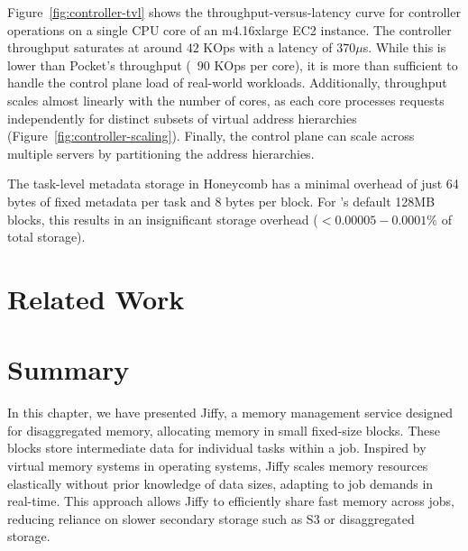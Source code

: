 Figure~\ref{fig:controller-tvl} shows the throughput-versus-latency curve for \jiffy controller operations on a single CPU core of an m4.16xlarge EC2 instance. The controller throughput saturates at around $42$ KOps with a latency of $370\mu$s. While this is lower than Pocket's throughput (~$90$ KOps per core), it is more than sufficient to handle the control plane load of real-world workloads. Additionally, throughput scales almost linearly with the number of cores, as each core processes requests independently for distinct subsets of virtual address hierarchies (Figure~\ref{fig:controller-scaling}). Finally, the control plane can scale across multiple servers by partitioning the address hierarchies.

 The task-level metadata storage in Honeycomb has a minimal overhead of just 64 bytes of fixed metadata per task and 8 bytes per block. For \jiffy's default 128MB blocks, this results in an insignificant storage overhead ($<0.00005-0.0001\%$ of total storage).

\section{Related Work}

\section{Summary}
\label{sec:jiffysummary}
In this chapter, we have presented Jiffy, a memory management service designed for disaggregated memory, allocating memory in small fixed-size blocks. These blocks store intermediate data for individual tasks within a job. Inspired by virtual memory systems in operating systems, Jiffy scales memory resources elastically without prior knowledge of data sizes, adapting to job demands in real-time. This approach allows Jiffy to efficiently share fast memory across jobs, reducing reliance on slower secondary storage such as S3 or disaggregated storage.








